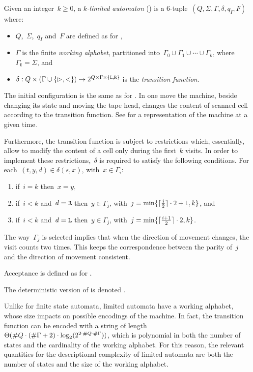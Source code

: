 \begin{defn}\label{def:kla}
	Given an integer~$k\ge0$, a \emph{$k$-limited automaton} (\kLA) is a 6-tuple~$(Q,\Sigma,\Gamma,\delta,q_I,F)$ where:
	\begin{itemize}
		\item $Q$,~$\Sigma$,~$q_I$ and~$F$ are defined as for \TNFAs,
		\item $\Gamma$ is the finite \emph{working alphabet}, partitioned into~$\Gamma_0\cup\Gamma_1\cup\cdots\cup\Gamma_k$, where~$\Gamma_0=\Sigma$, and
		\item $\delta:Q\times(\Gamma\cup\{\rhd,\lhd\})\to2^{Q\times\Gamma\times\{\mathtt L,\mathtt R\}}$ is the \emph{transition function}.
	\end{itemize}
	The initial configuration is the same as for \TNFAs.
	In one move the machine, beside changing its state and moving the tape head, changes the content of scanned cell according to the transition function.
	See  for a representation of the machine at a given time.

	Furthermore, the transition function is subject to restrictions which, essentially, allow to modify the content of a cell only during the first~$k$ visits.
	In order to implement these restrictions,~$\delta$ is required to satisfy the following conditions. For each~$(t,y,d)\in\delta(s,x)$, with~$x\in\Gamma_i$:
	\begin{enumerate}[(1)]
		\item if~$i=k$ then~$x=y$,
		\item if~$i<k$ and~$d=\mathtt R$ then~$y\in\Gamma_j$, with~$j=\min\{\lceil \frac{i}{2} \rceil\cdot 2+1,k\}$, and
		\item if~$i<k$ and~$d=\mathtt L$ then~$y\in\Gamma_j$, with~$j=\min\{\lceil \frac{i+1}{2} \rceil\cdot 2,k\}$.
	\end{enumerate}
	The way~$\Gamma_j$ is selected implies that when the direction of movement changes, the visit counts two times.
	This keeps the correspondence between the parity of~$j$ and the direction of movement consistent.

	\noindent Acceptance is defined as for \TNFAs.

	\noindent The deterministic version of \kLAs is denoted \kDLAs.
\end{defn}

Unlike for finite state automata, limited automata have a working alphabet, whose size impacts on possible encodings of the machine.
In fact, the transition function can be encoded with a string of length~$\Theta(\# Q\cdot(\# \Gamma+2)\cdot\log_2(2^{2\cdot\# Q\cdot\# \Gamma}))$, which is polynomial in both the number of states and the cardinality of the working alphabet.
For this reason, the relevant quantities for the descriptional complexity of limited automata are both the number of states and the size of the working alphabet.


